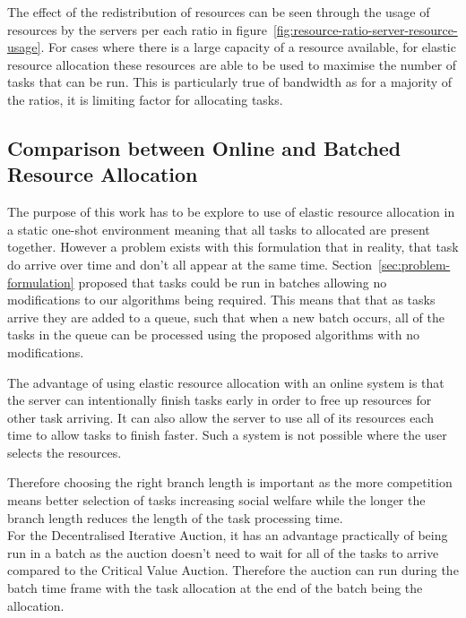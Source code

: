 The effect of the redistribution of resources can be seen through the usage of resources by the servers per
each ratio in figure~\ref{fig:resource-ratio-server-resource-usage}. For cases where there is a large capacity of a
resource available, for elastic resource allocation these resources are able to be used to maximise the number of tasks
that can be run. This is particularly true of bandwidth as for a majority of the ratios, it is limiting factor for
allocating tasks.

\subsection{Comparison between Online and Batched Resource Allocation}
\label{subsec:comparison-between-online-and-batched-resource-allocation}
The purpose of this work has to be explore to use of elastic resource allocation in a static one-shot environment
meaning that all tasks to allocated are present together. However a problem exists with this formulation
that in reality, that task do arrive over time and don't all appear at the same time.
Section~\ref{sec:problem-formulation} proposed that tasks could be run in batches allowing no modifications to our
algorithms being required. This means that that as tasks arrive they are added to a
queue, such that when a new batch occurs, all of the tasks in the queue can be processed using the proposed algorithms
with no modifications.

The advantage of using elastic resource allocation with an online system is that the server can intentionally finish
tasks early in order to free up resources for other task arriving. It can also allow the server to use all of its
resources each time to allow tasks to finish faster. Such a system is not possible where the user selects
the resources.

Therefore choosing the right branch length is important as the more competition means better selection of tasks
increasing social welfare while the longer the branch length reduces the length of the task processing time. \\
For the Decentralised Iterative Auction, it has an advantage practically of being run in a batch as the auction doesn't need to
wait for all of the tasks to arrive compared to the Critical Value Auction. Therefore the auction can run during the
batch time frame with the task allocation at the end of the batch being the allocation.

